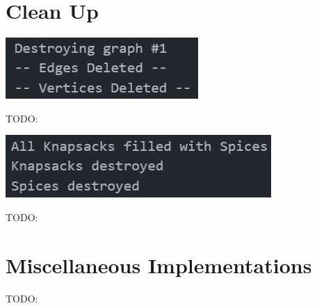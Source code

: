 \documentclass[12pt, letterpaper]{article}
\begin{document}
\section{Clean Up} \label{CleanUp}
\begin{center}
   \includegraphics{images/Graph1_CleanUp.png}
\end{center}
TODO:
\begin{center}
   \includegraphics{images/SpiceKnapsack_CleanUp.png}
\end{center}
TODO:

\section{Miscellaneous Implementations} \label{MiscImp}
TODO:
\end{document}
